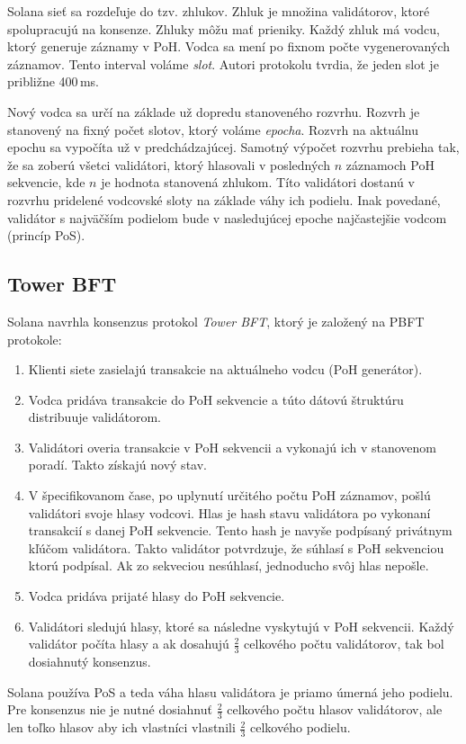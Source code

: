 Solana sieť sa rozdeľuje do tzv. zhlukov. Zhluk je množina validátorov, ktoré spolupracujú na konsenze. Zhluky môžu mať prieniky. Každý zhluk má vodcu, ktorý generuje záznamy v PoH. Vodca sa mení po fixnom počte vygenerovaných záznamov. Tento interval voláme \textit{slot}. Autori protokolu tvrdia, že jeden slot je približne 400\,ms. 

Nový vodca sa určí na základe už dopredu stanoveného rozvrhu. Rozvrh je stanovený na fixný počet slotov, ktorý voláme \textit{epocha}. Rozvrh na aktuálnu epochu sa vypočíta už v predchádzajúcej. Samotný výpočet rozvrhu prebieha tak, že sa zoberú všetci validátori, ktorý hlasovali v posledných $n$ záznamoch PoH sekvencie, kde $n$ je hodnota stanovená zhlukom. Títo validátori dostanú v rozvrhu pridelené vodcovské sloty na základe váhy ich podielu. Inak povedané, validátor s najväčším podielom bude v nasledujúcej epoche najčastejšie vodcom (princíp PoS).

\subsection{Tower BFT}\label{subsec:towerbft}

Solana navrhla konsenzus protokol \textit{Tower BFT}, ktorý je založený na PBFT protokole:
\begin{enumerate}
	\item Klienti siete zasielajú transakcie na aktuálneho vodcu (PoH generátor).
	\item Vodca pridáva transakcie do PoH sekvencie a túto dátovú štruktúru distribuuje validátorom.
	\item Validátori overia transakcie v PoH sekvencii a vykonajú ich v stanovenom poradí. Takto získajú nový stav.
	\item V špecifikovanom čase, po uplynutí určitého počtu PoH záznamov, pošlú validátori svoje hlasy vodcovi. Hlas je hash stavu validátora po vykonaní transakcií s danej PoH sekvencie. Tento hash je navyše podpísaný privátnym kľúčom validátora. Takto validátor potvrdzuje, že súhlasí s PoH sekvenciou ktorú podpísal. Ak zo sekveciou nesúhlasí, jednoducho svôj hlas nepošle.
	\item Vodca pridáva prijaté hlasy do PoH sekvencie.
	\item Validátori sledujú hlasy, ktoré sa následne vyskytujú v PoH sekvencii. Každý validátor počíta hlasy a ak dosahujú $\frac{2}{3}$ celkového počtu validátorov, tak bol dosiahnutý konsenzus.
\end{enumerate}
Solana používa PoS a teda váha hlasu validátora je priamo úmerná jeho podielu. Pre konsenzus nie je nutné dosiahnuť $\frac{2}{3}$ celkového počtu hlasov validátorov, ale len toľko hlasov aby ich vlastníci vlastnili $\frac{2}{3}$ celkového podielu.

